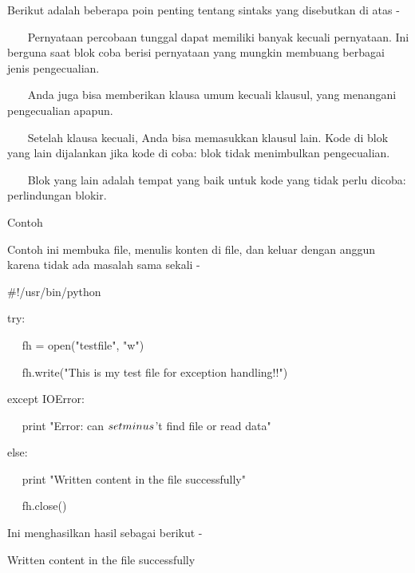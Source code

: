 \vspace{12pt}
\vspace{12pt}
Berikut adalah beberapa poin penting tentang sintaks yang disebutkan di atas - \par
\vspace{12pt}
~~~ Pernyataan percobaan tunggal dapat memiliki banyak kecuali pernyataan. Ini berguna saat blok coba berisi pernyataan yang mungkin membuang berbagai jenis pengecualian. \par
\vspace{12pt}
~~~ Anda juga bisa memberikan klausa umum kecuali klausul, yang menangani pengecualian apapun. \par
\vspace{12pt}
~~~ Setelah klausa kecuali, Anda bisa memasukkan klausul lain. Kode di blok yang lain dijalankan jika kode di coba: blok tidak menimbulkan pengecualian. \par
\vspace{12pt}
~~~ Blok yang lain adalah tempat yang baik untuk kode yang tidak perlu dicoba: perlindungan blokir. \par
\vspace{12pt}
Contoh \par
\vspace{12pt}
Contoh ini membuka file, menulis konten di file, dan keluar dengan anggun karena tidak ada masalah sama sekali - \par
\vspace{12pt}
 $  \#  $!/usr/bin/python \par
\vspace{12pt}
try: \par
~~ fh = open("testfile", "w") \par
~~ fh.write("This is my test file for exception handling!!") \par
except IOError: \par
~~ print "Error: can $  \\setminus  $'t find file or read data" \par
else: \par
~~ print "Written content in the file successfully" \par
~~ fh.close() \par
\vspace{12pt}
Ini menghasilkan hasil sebagai berikut - \par
\vspace{12pt}
Written content in the file successfully \par
\vspace{12pt}
